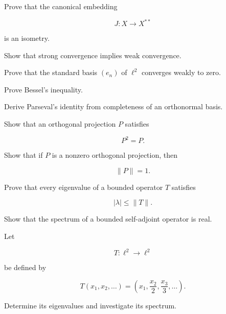 \begin{exercise}[3]
Prove that the canonical embedding

\[
J:X\to X^{**}
\]

is an isometry.
\end{exercise}

\begin{exercise}[3]
Show that strong convergence implies weak convergence.
\end{exercise}

\begin{exercise}[3]
Prove that the standard basis \((e_n)\) of \(\ell^2\) converges weakly to
zero.
\end{exercise}

\begin{exercise}[3]
Prove Bessel's inequality.
\end{exercise}

\begin{exercise}[3]
Derive Parseval's identity from completeness of an orthonormal basis.
\end{exercise}

\begin{exercise}[3]
Show that an orthogonal projection \(P\) satisfies

\[
P^2=P.
\]
\end{exercise}

\begin{exercise}[3]
Show that if \(P\) is a nonzero orthogonal projection, then

\[
\|P\|=1.
\]
\end{exercise}

\begin{exercise}[3]
Prove that every eigenvalue of a bounded operator \(T\) satisfies

\[
|\lambda|\leq\|T\|.
\]
\end{exercise}

\begin{exercise}[3]
Show that the spectrum of a bounded self-adjoint operator is real.
\end{exercise}

\begin{exercise}[3]
Let

\[
T:\ell^2\to\ell^2
\]

be defined by

\[
T(x_1,x_2,\ldots)
=
\left(
x_1,\frac{x_2}{2},\frac{x_3}{3},\ldots
\right).
\]

Determine its eigenvalues and investigate its spectrum.
\end{exercise}

